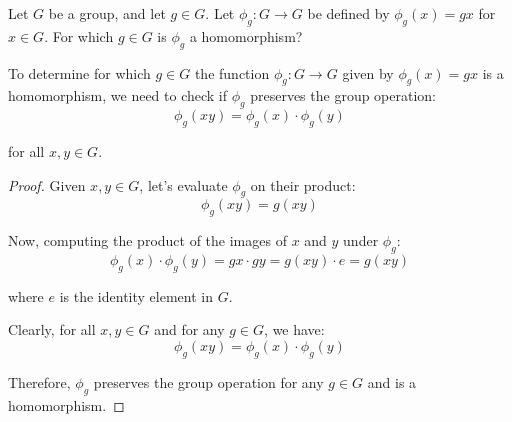 \documentclass[12pt]{amsart}
\theoremstyle{definition}
\numberwithin{equation}{section}
\theoremstyle{plain}
\begin{document}
\begin{exercise}{28} Let $G$ be a group, and let $g \in G$. Let $\phi_g : G \rightarrow G$ be defined by $\phi_g(x) = gx$ for $x \in G$. For which $g \in G$ is
    $\phi_g$ a homomorphism?

    To determine for which \( g \in G \) the function \( \phi_g : G \rightarrow G \) given by \( \phi_g(x) = gx \) is a homomorphism, we need to check if \( \phi_g \) preserves the group operation:
    \[
        \phi_g(xy) = \phi_g(x) \cdot \phi_g(y)
        \]
        
        for all \( x, y \in G \).
        
        \begin{proof}
Given \( x, y \in G \), let's evaluate \( \phi_g \) on their product:
\[
\phi_g(xy) = g(xy)
\]

Now, computing the product of the images of \( x \) and \( y \) under \( \phi_g \):
\[
\phi_g(x) \cdot \phi_g(y) = gx \cdot gy = g(xy) \cdot e = g(xy)
\]

where \( e \) is the identity element in \( G \).

Clearly, for all \( x, y \in G \) and for any \( g \in G \), we have:
\[
\phi_g(xy) = \phi_g(x) \cdot \phi_g(y)
\]

Therefore, \( \phi_g \) preserves the group operation for any \( g \in G \) and is a homomorphism.
    \end{proof}
\end{exercise}
\vspace*{20pt}
\end{document}
